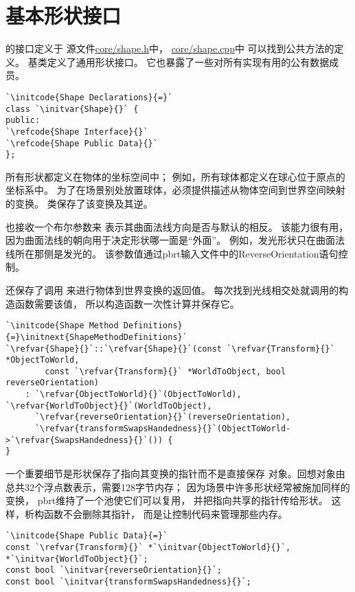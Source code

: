 \section{基本形状接口}\label{sec:基本形状接口}

的接口定义于
源文件\href{https://github.com/mmp/pbrt-v3/tree/master/src/core/shape.h}{\ttfamily core/shape.h}中，
\href{https://github.com/mmp/pbrt-v3/tree/master/src/core/shape.cpp}{\ttfamily core/shape.cpp}中
可以找到公共方法的定义。
基类定义了通用形状接口。
它也暴露了一些对所有实现有用的公有数据成员。
\begin{lstlisting}
`\initcode{Shape Declarations}{=}`
class `\initvar{Shape}{}` {
public:
`\refcode{Shape Interface}{}`
`\refcode{Shape Public Data}{}`
};
\end{lstlisting}

所有形状都定义在物体的坐标空间中；
例如，所有球体都定义在球心位于原点的坐标系中。
为了在场景别处放置球体，必须提供描述从物体空间到世界空间映射的变换。
类保存了该变换及其逆。

也接收一个布尔参数来
表示其曲面法线方向是否与默认的相反。
该能力很有用，因为曲面法线的朝向用于决定形状哪一面是“外面”。
例如，发光形状只在曲面法线所在那侧是发光的。
该参数值通过pbrt输入文件中的{\ttfamily ReverseOrientation}语句控制。

还保存了调用
来进行物体到世界变换的返回值。
每次找到光线相交处就调用的构造函数需要该值，
所以构造函数一次性计算并保存它。
\begin{lstlisting}
`\initcode{Shape Method Definitions}{=}\initnext{ShapeMethodDefinitions}`
`\refvar{Shape}{}`::`\refvar{Shape}{}`(const `\refvar{Transform}{}` *ObjectToWorld,
        const `\refvar{Transform}{}` *WorldToObject, bool reverseOrientation)
    : `\refvar{ObjectToWorld}{}`(ObjectToWorld), `\refvar{WorldToObject}{}`(WorldToObject),
      `\refvar{reverseOrientation}{}`(reverseOrientation),
      `\refvar{transformSwapsHandedness}{}`(ObjectToWorld->`\refvar{SwapsHandedness}{}`()) {
}
\end{lstlisting}

一个重要细节是形状保存了指向其变换的指针而不是直接保存
对象。回想对象由总共32个浮点数表示，需要128字节内存；
因为场景中许多形状经常被施加同样的变换，
pbrt维持了一个池使它们可以复用，
并把指向共享的指针传给形状。
这样，析构函数不会删除其指针，
而是让控制代码来管理那些内存。
\begin{lstlisting}
`\initcode{Shape Public Data}{=}`
const `\refvar{Transform}{}` *`\initvar{ObjectToWorld}{}`, *`\initvar{WorldToObject}{}`;
const bool `\initvar{reverseOrientation}{}`;
const bool `\initvar{transformSwapsHandedness}{}`;
\end{lstlisting}

